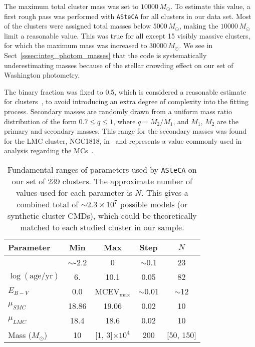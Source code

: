\documentclass{aa}
\begin{document}
The maximum total cluster mass was set to $10000\,M_{\odot}$.
%
To estimate this value, a first rough pass was performed with
\texttt{ASteCA} for all clusters in our data set. Most of the clusters were assigned
total masses below $5000\,M_{\odot}$, making the $10000\,M_{\odot}$ limit a
reasonable value.
%
This was true for all except 15 visibly massive clusters, for which the
maximum mass was increased to $30000\,M_{\odot}$. We see
in Sect~\ref{sssec:integ_photom_masses} that the code is systematically
underestimating masses because of the stellar crowding effect on our set of
Washington photometry.

The binary fraction was fixed to 0.5, which is considered a
reasonable estimate for clusters~\citep{von_Hippel_2005,Sollima_2010}, to
avoid introducing an extra degree of complexity into the fitting process.
Secondary masses are randomly drawn from a uniform mass ratio distribution of
the form $0.7{\le}q{\le}1$, where $q{=}M_2/M_1$, and $M_1$, $M_2$ are the
primary and secondary masses. This range for the secondary masses was found for
the LMC cluster, NGC1818, in~\cite{Elson_1998} and represents a value
commonly used in analysis regarding the MCs~\citep[see][and references therein]
{Rubele_2011}.

\begin{table}
\centering
\caption{Fundamental ranges of parameters used by \texttt{ASteCA} on our set
of 239 clusters. The approximate number of values used for each parameter is
$N$. This gives a combined total of ${\sim}2.3 {\times}10^7$ possible models 
(or synthetic cluster CMDs), which could be theoretically matched to each studied
cluster in our sample.}
\label{tab:ga-range}
\begin{tabular}{lcccc}
\hline\hline
 Parameter & Min & Max & Step & $N$\\
\hline
[Fe/H] & $\sim$-2.2 & 0 & $\sim$0.1 & 23\\
$\log\mathrm{(age/yr)}$ & 6. & 10.1 & 0.05 & 82\\
$E_{B-V}$ & 0.0 & MCEV$_{\max}$ & ${\sim}$0.01 & $\sim$12\\
$\mu_{SMC}$ & 18.86 & 19.06 & 0.02 & 10\\
$\mu_{LMC}$ & 18.4 & 18.6 & 0.02 & 10\\
Mass ($M_{\odot}$) & 10 & [1, 3]${\times}10^{4}$ & 200 & [50, 150]\\
\hline
\end{tabular}
\end{table}
\end{document}
